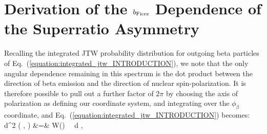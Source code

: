 %
%
%
%
\section[SuperRatio]{Derivation of the $b_{\mathrm{Fierz}}$ Dependence of the Superratio Asymmetry}
\label{appendix:superratio}
%
Recalling the integrated JTW probability distribution for outgoing beta particles of Eq.~(\ref{equation:integrated_jtw_INTRODUCTION}), 
we note that the only angular dependence remaining in this spectrum is the dot product between the direction of beta emission and the direction of nuclear spin-polarization.  It is therefore possible to pull out a further factor of $2\pi$ by choosing the axis of polarization as defining our coordinate system, and integrating over the $\phi_\beta$ coordinate, and Eq.~(\ref{equation:integrated_jtw_INTRODUCTION}) becomes:
\bea
	\textrm{d}^2 \Gamma  ( \Ebeta, \theta ) %
	&=&
	W(\Ebeta)  \, \dEe \, \textrm{d} \theta , 
